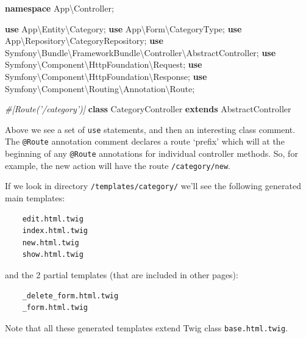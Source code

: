 \documentclass[a4paperpaper,openright]{book}
\newenvironment{Shaded}{}{}
\newcommand{\CommentTok}[1]{\textcolor[rgb]{0.38,0.63,0.69}{\textit{#1}}}
\newcommand{\KeywordTok}[1]{\textcolor[rgb]{0.00,0.44,0.13}{\textbf{#1}}}
\newcommand{\NormalTok}[1]{#1}
\newcommand{\OtherTok}[1]{\textcolor[rgb]{0.00,0.44,0.13}{#1}}
\begin{document}
\begin{Shaded}
\begin{Highlighting}[]
    \KeywordTok{namespace}\NormalTok{ App\textbackslash{}Controller}\OtherTok{;}

    \KeywordTok{use}\NormalTok{ App\textbackslash{}Entity\textbackslash{}Category}\OtherTok{;}
    \KeywordTok{use}\NormalTok{ App\textbackslash{}Form\textbackslash{}CategoryType}\OtherTok{;}
    \KeywordTok{use}\NormalTok{ App\textbackslash{}Repository\textbackslash{}CategoryRepository}\OtherTok{;}
    \KeywordTok{use}\NormalTok{ Symfony\textbackslash{}Bundle\textbackslash{}FrameworkBundle\textbackslash{}Controller\textbackslash{}AbstractController}\OtherTok{;}
    \KeywordTok{use}\NormalTok{ Symfony\textbackslash{}Component\textbackslash{}HttpFoundation\textbackslash{}Request}\OtherTok{;}
    \KeywordTok{use}\NormalTok{ Symfony\textbackslash{}Component\textbackslash{}HttpFoundation\textbackslash{}Response}\OtherTok{;}
    \KeywordTok{use}\NormalTok{ Symfony\textbackslash{}Component\textbackslash{}Routing\textbackslash{}Annotation\textbackslash{}Route}\OtherTok{;}

    \CommentTok{#[Route('/category')]}
    \KeywordTok{class}\NormalTok{ CategoryController }\KeywordTok{extends}\NormalTok{ AbstractController}
\end{Highlighting}
\end{Shaded}

Above we see a set of \texttt{use} statements, and then an interesting
class comment. The \texttt{@Route} annotation comment declares a route
`prefix' which will at the beginning of any \texttt{@Route} annotations
for individual controller methods. So, for example, the new action will
have the route \texttt{/category/new}.

If we look in directory \texttt{/templates/category/} we'll see the
following generated main templates:

\begin{verbatim}
    edit.html.twig
    index.html.twig
    new.html.twig
    show.html.twig
\end{verbatim}

and the 2 partial templates (that are included in other pages):

\begin{verbatim}
    _delete_form.html.twig
    _form.html.twig
\end{verbatim}

Note that all these generated templates extend Twig class
\texttt{base.html.twig}.
\end{document}
